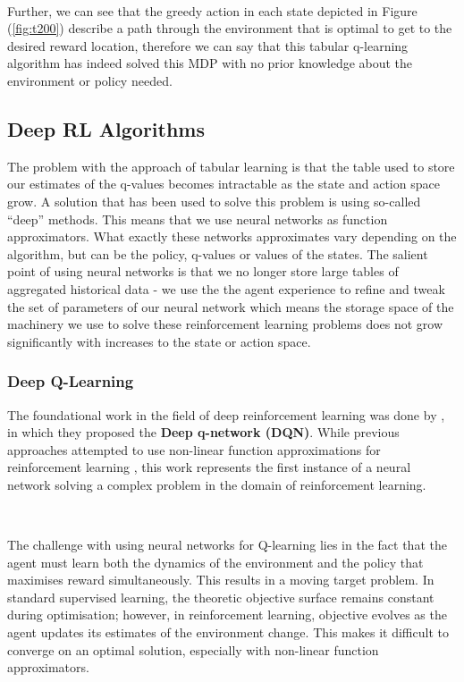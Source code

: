 \documentclass{article}
\begin{document}
\

Further, we can see that the greedy action in each state depicted in Figure (\ref{fig:t200}) describe a path through the environment that is optimal to get to the desired reward location, therefore we can say that this tabular q-learning algorithm has indeed solved this MDP with no prior knowledge about the environment or policy needed.

\subsection{Deep RL Algorithms}\label{sec:deep_rl}

The problem with the approach of tabular learning is that the table used to store our estimates of the q-values becomes intractable as the state and action space grow. A solution that has been used to solve this problem is using so-called ``deep'' methods. This means that we use neural networks as function approximators. What exactly these networks approximates vary depending on the algorithm, but can be the policy, q-values or values of the states. The salient point of using neural networks is that we no longer store large tables of aggregated historical data - we use the the agent experience to refine and tweak the set of parameters of our neural network which means the storage space of the machinery we use to solve these reinforcement learning problems does not grow significantly with increases to the state or action space.

\subsubsection{Deep Q-Learning}

The foundational work in the field of deep reinforcement learning was done by \citet{mnih2013playing}, in which they proposed the \textbf{Deep q-network (DQN)}. While previous approaches attempted to use non-linear function approximations for reinforcement learning \citep{tsitsiklis1996temporal}, this work represents the first instance of a neural network solving a complex problem in the domain of reinforcement learning.

\

The challenge with using neural networks for Q-learning lies in the fact that the agent must learn both the dynamics of the environment and the policy that maximises reward simultaneously. This results in a moving target problem. In standard supervised learning, the theoretic objective surface remains constant during optimisation; however, in reinforcement learning, objective evolves as the agent updates its estimates of the environment change. This makes it difficult to converge on an optimal solution, especially with non-linear function approximators.
\end{document}
